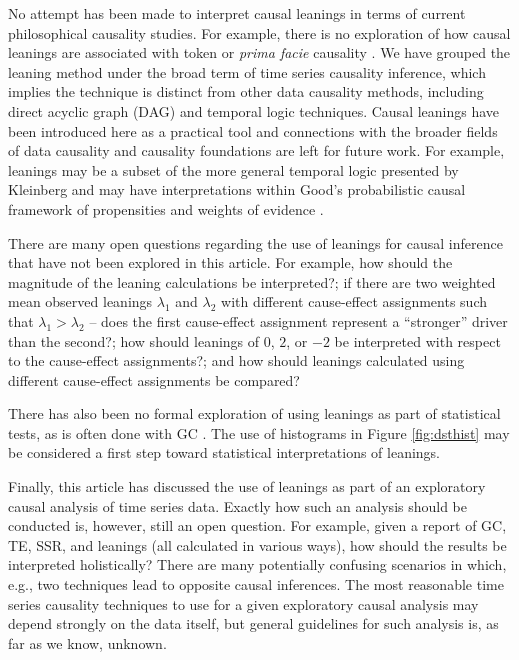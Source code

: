 \documentclass[twocolumn,aps,pre,groupedaddress]{revtex4-1}
\begin{document}
No attempt has been made to interpret causal leanings in terms of current philosophical causality studies.   For example, there is no exploration of how causal leanings are associated with token or {\em prima facie} causality \cite{kleinberg2012}.  We have grouped the leaning method under the broad term of time series causality inference, which implies the technique is distinct from other data causality methods, including direct acyclic graph (DAG) \cite{Pearl2000} and temporal logic \cite{kleinberg2012} techniques.  Causal leanings have been introduced here as a practical tool and connections with the broader fields of data causality and causality foundations are left for future work.  For example, leanings may be a subset of the more general temporal logic presented by Kleinberg \cite{kleinberg2012} and may have interpretations within Good's probabilistic causal framework of propensities and weights of evidence \cite{Good1984}.

There are many open questions regarding the use of leanings for causal inference that have not been explored in this article.  For example, how should the magnitude of the leaning calculations be interpreted?; if there are two weighted mean observed leanings $\lambda_1$ and $\lambda_2$ with different cause-effect assignments such that $\lambda_1 > \lambda_2$ -- does the first cause-effect assignment represent a ``stronger'' driver than the second?; how should leanings of $0$, $2$, or $-2$ be interpreted with respect to the cause-effect assignments?; and how should leanings calculated using different cause-effect assignments be compared?

There has also been no formal exploration of using leanings as part of statistical tests, as is often done with GC \cite{Pierce1977}.  The use of histograms in Figure \ref{fig:dsthist} may be considered a first step toward statistical interpretations of leanings.

Finally, this article has discussed the use of leanings as part of an exploratory causal analysis of time series data.  Exactly how such an analysis should be conducted is, however, still an open question.  For example, given a report of GC, TE, SSR, and leanings (all calculated in various ways), how should the results be interpreted holistically?  There are many potentially confusing scenarios in which, e.g., two techniques lead to opposite causal inferences.  The most reasonable time series causality techniques to use for a given exploratory causal analysis may depend strongly on the data itself, but general guidelines for such analysis is, as far as we know, unknown.

%

\end{document}
